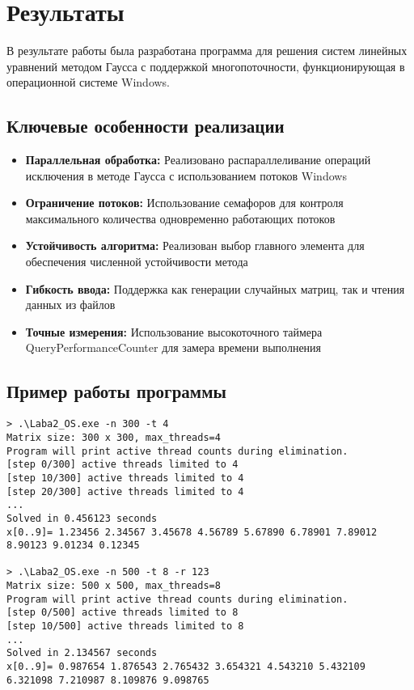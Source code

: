 \section{Результаты}

В результате работы была разработана программа для решения систем линейных уравнений методом Гаусса с поддержкой многопоточности, функционирующая в операционной системе Windows.

\subsection{Ключевые особенности реализации}

\begin{itemize}
    \item \textbf{Параллельная обработка:} Реализовано распараллеливание операций исключения в методе Гаусса с использованием потоков Windows
    \item \textbf{Ограничение потоков:} Использование семафоров для контроля максимального количества одновременно работающих потоков
    \item \textbf{Устойчивость алгоритма:} Реализован выбор главного элемента для обеспечения численной устойчивости метода
    \item \textbf{Гибкость ввода:} Поддержка как генерации случайных матриц, так и чтения данных из файлов
    \item \textbf{Точные измерения:} Использование высокоточного таймера QueryPerformanceCounter для замера времени выполнения
\end{itemize}

\subsection{Пример работы программы}

\begin{verbatim}
> .\Laba2_OS.exe -n 300 -t 4
Matrix size: 300 x 300, max_threads=4
Program will print active thread counts during elimination.
[step 0/300] active threads limited to 4
[step 10/300] active threads limited to 4
[step 20/300] active threads limited to 4
...
Solved in 0.456123 seconds
x[0..9]= 1.23456 2.34567 3.45678 4.56789 5.67890 6.78901 7.89012 8.90123 9.01234 0.12345

> .\Laba2_OS.exe -n 500 -t 8 -r 123
Matrix size: 500 x 500, max_threads=8
Program will print active thread counts during elimination.
[step 0/500] active threads limited to 8
[step 10/500] active threads limited to 8
...
Solved in 2.134567 seconds
x[0..9]= 0.987654 1.876543 2.765432 3.654321 4.543210 5.432109 6.321098 7.210987 8.109876 9.098765
\end{verbatim}
